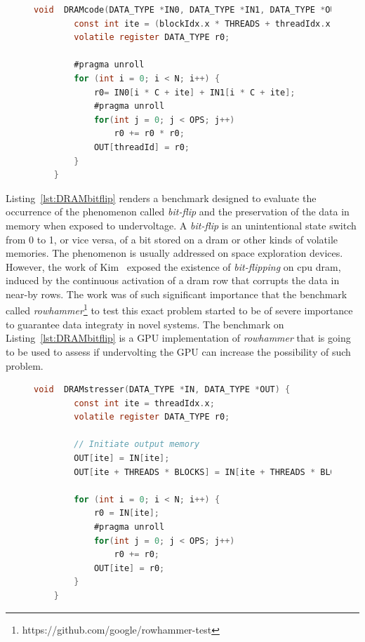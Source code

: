 \begin{figure}[h]
    \begin{lstlisting}[language=C, caption=DRAM Benchmark Code, label=lst:DRAMbench, basicstyle=\footnotesize\ttfamily,abovecaptionskip=0pt, captionpos=b]
    void  DRAMcode(DATA_TYPE *IN0, DATA_TYPE *IN1, DATA_TYPE *OUT) {
        const int ite = (blockIdx.x * THREADS + threadIdx.x) % MEM_BLOCK;
        volatile register DATA_TYPE r0;
        
        #pragma unroll
        for (int i = 0; i < N; i++) {
            r0= IN0[i * C + ite] + IN1[i * C + ite];
            #pragma unroll
            for(int j = 0; j < OPS; j++)  
                r0 += r0 * r0;
            OUT[threadId] = r0;
        }
    }
    \end{lstlisting}
\end{figure}

Listing~\ref{lst:DRAMbitflip} renders a benchmark designed to evaluate the occurrence of the phenomenon called \textit{bit-flip} and the preservation of the data in memory when exposed to undervoltage. A \textit{bit-flip} is an unintentional state switch from 0 to 1, or vice versa, of a bit stored on a \acrshort{dram} or other kinds of volatile memories. The phenomenon is usually addressed on space exploration devices. However, the work of Kim~\cite{kim_flipping_2014} exposed the existence of \textit{bit-flipping} on \acrshort{cpu} \acrshort{dram}, induced by the continuous activation of a \acrshort{dram} row that corrupts the data in near-by rows. The work was of such significant importance that the benchmark called \textit{rowhammer}\footnote{https://github.com/google/rowhammer-test} to test this exact problem started to be of severe importance to guarantee data integraty in novel systems. The benchmark on Listing~\ref{lst:DRAMbitflip} is a GPU implementation of \textit{rowhammer} that is going to be used to assess if undervolting the GPU can increase the possibility of such problem.

\begin{figure}[h]
    \begin{lstlisting}[language=C, caption=DRAM Bit-Flip Stress Test Code - \textit{rowhammer} inspired  benchmark, label=lst:DRAMbitflip, basicstyle=\footnotesize\ttfamily,abovecaptionskip=0pt, captionpos=b]
    void  DRAMstresser(DATA_TYPE *IN, DATA_TYPE *OUT) {
        const int ite = threadIdx.x;
        volatile register DATA_TYPE r0;
        
        // Initiate output memory
        OUT[ite] = IN[ite];
        OUT[ite + THREADS * BLOCKS] = IN[ite + THREADS * BLOCKS];
        
        for (int i = 0; i < N; i++) {
            r0 = IN[ite];
            #pragma unroll
            for(int j = 0; j < OPS; j++)  
                r0 += r0;
            OUT[ite] = r0;
        }
    }
    \end{lstlisting}
\end{figure}


